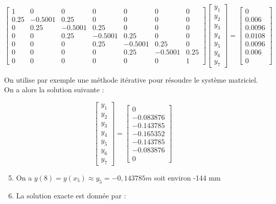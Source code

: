 \documentclass[10pt]{article}
\begin{document}
\[
\left[\begin{array}{ccccccc}
1 & 0 & 0 & 0 & 0 & 0 & 0 \\
0.25 & -0.5001 & 0.25 & 0 & 0 & 0 & 0 \\
0 & 0.25 & -0.5001 & 0.25 & 0 & 0 & 0 \\
0 & 0 & 0.25 & -0.5001 & 0.25 & 0 & 0 \\
0 & 0 & 0 & 0.25 & -0.5001 & 0.25 & 0 \\
0 & 0 & 0 & 0 & 0.25 & -0.5001 & 0.25 \\
0 & 0 & 0 & 0 & 0 & 0 & 1
\end{array}\right]\left[\begin{array}{l}
y_{1} \\
y_{2} \\
y_{3} \\
y_{4} \\
y_{5} \\
y_{6} \\
y_{7}
\end{array}\right]=\left[\begin{array}{c}
0 \\
0.006 \\
0.0096 \\
0.0108 \\
0.0096 \\
0.006 \\
0
\end{array}\right]
\]

On utilise par exemple une méthode itérative pour résoudre le système matriciel. On a alors la solution suivante :

\[
\left[\begin{array}{l}
y_{1} \\
y_{2} \\
y_{3} \\
y_{4} \\
y_{5} \\
y_{6} \\
y_{7}
\end{array}\right]=\left[\begin{array}{c}
0 \\
-0.083876 \\
-0.143785 \\
-0.165352 \\
-0.143785 \\
-0.083876 \\
0
\end{array}\right]
\]

\begin{enumerate}
  \setcounter{enumi}{4}
  \item On a \(y(8)=y\left(x_{5}\right) \approx y_{5}=-0,143785 m\) soit environ -144 mm
  \item La solution exacte est donnée par :
\end{enumerate}
\end{document}

